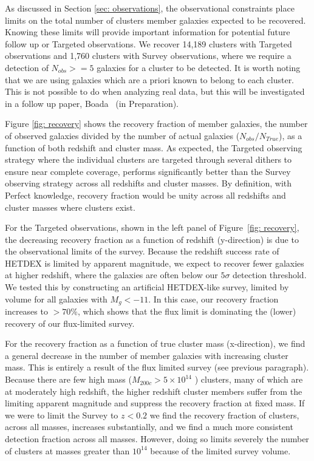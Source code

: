 \documentclass[fleqn,usenatbib]{mnras}
\begin{document}
As discussed in Section \ref{sec: observations}, the observational constraints place limits on the total number of clusters member galaxies expected to be recovered. Knowing these limits will provide important information for potential future follow up or Targeted observations. We recover 14,189 clusters with Targeted observations and 1,760 clusters with Survey observations, where we require a detection of $N_{obs} >=5$ galaxies for a cluster to be detected. It is worth noting that we are using galaxies which are a priori known to belong to each cluster. This is not possible to do when analyzing real data, but this will be investigated in a follow up paper, Boada \etal\ (in Preparation).

Figure \ref{fig: recovery} shows the recovery fraction of member galaxies, the number of observed galaxies divided by the number of actual galaxies ($N_{obs}/N_{True}$), as a function of both redshift and cluster mass. As expected, the Targeted observing strategy where the individual clusters are targeted through several dithers to ensure near complete coverage, performs significantly better than the Survey observing strategy across all redshifts and cluster masses. By definition, with Perfect knowledge, recovery fraction would be unity across all redshifts and cluster masses where clusters exist.

For the Targeted observations, shown in the left panel of Figure~\ref{fig: recovery}, the decreasing recovery fraction as a function of redshift (y-direction) is due to the observational limits of the survey. Because the redshift success rate of HETDEX is limited by apparent magnitude, we expect to recover fewer galaxies at higher redshift, where the galaxies are often below our $5\sigma$ detection threshold. We tested this by constructing an artificial HETDEX-like survey, limited by volume for all galaxies with $M_g < -11$. In this case, our recovery fraction increases to $>70$\%, which shows that the flux limit is dominating the (lower) recovery of our flux-limited survey.

For the recovery fraction as a function of true cluster mass (x-direction), we find a general decrease in the number of member galaxies with increasing cluster mass. This  is entirely a result of the flux limited survey (see previous paragraph). Because there are few high mass ($M_{200c}>5\times10^{14}$ \Msol) clusters, many of which are at moderately high redshift, the higher redshift cluster members suffer from the limiting apparent magnitude and suppress the recovery fraction at fixed mass. If we were to limit the Survey to $z<0.2$ we find the recovery fraction of clusters, across all masses, increases substantially, and we find a much more consistent detection fraction across all masses. However, doing so limits severely the number of clusters at masses greater than $10^{14}$ \Msol because of the limited survey volume. 
\end{document}

